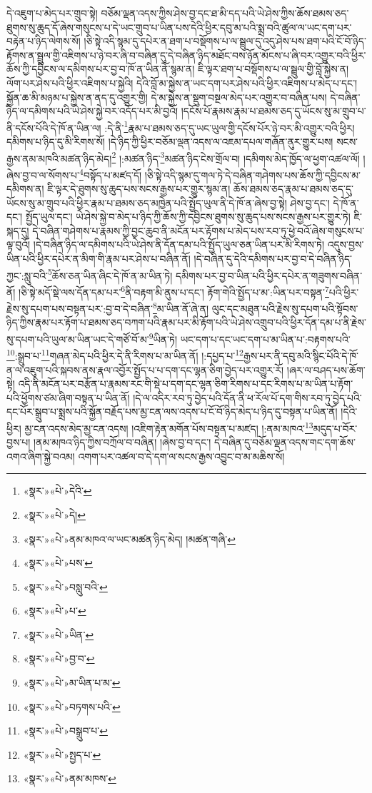 དེ་འཇུག་པ་མེད་པར་གྲུབ་སྟེ། བཅོམ་ལྡན་འདས་ཀྱིས་ཤེས་བྱ་དང་ཐ་མི་དད་པའི་ཡེ་ཤེས་ཀྱིས་ཆོས་ཐམས་ཅད་ཐུགས་སུ་ཆུད་དོ་ཞེས་གསུངས་པ་དེ་ཡང་གྲུབ་པ་ཡིན་པས་དེའི་ཕྱིར་དབུ་མ་པའི་སྨྲ་བའི་ཚུལ་ལ་ཡང་དག་པར་བརྟེན་པ་ཉིད་ལེགས་སོ། །ཅི་སྟེ་འདི་སྙམ་དུ་དཔེར་ན་ཐག་པ་བསྡོགས་པ་ལ་སྦྲུལ་དུ་འདུ་ཤེས་པས་ཐག་པའི་ངོ་བོ་ཉིད་རྟོགས་ན་སྦྲུལ་གྱི་འཇིགས་པ་ཉེ་བར་ཞི་བ་བཞིན་དུ་དེ་བཞིན་ཉིད་མཐོང་བས་ཉོན་མོངས་པ་ཞི་བར་འགྱུར་བའི་ཕྱིར་ཆོས་ཀྱི་དབྱིངས་ལ་དམིགས་པར་བྱ་བ་ཁོ་ན་ཡིན་ནོ་སྙམ་ན། ཇི་ལྟར་ཐག་པ་བསྡོགས་པ་ལ་སྦྲུལ་གྱི་བློ་སྐྱེས་ན། ལོག་པར་ཤེས་པའི་ཕྱིར་འཇིགས་པ་སྐྱེའི། དེའི་བློ་མ་སྐྱེས་ན་ཡང་དག་པར་ཤེས་པའི་ཕྱིར་འཇིགས་པ་མེད་པ་དང་། སྐྱོན་ཆ་མི་མཉམ་པ་སྐྱེས་ན་ནད་དུ་འགྱུར་གྱི། དེ་མ་སྐྱེས་ན་སྡུག་བསྔལ་མེད་པར་འགྱུར་བ་བཞིན་པས། དེ་བཞིན་ཉིད་ལ་དམིགས་པའི་ཡེ་ཤེས་སྐྱེ་བར་འདོད་པར་མི་བྱའོ། །དངོས་པོ་རྣམས་རྣམ་པ་ཐམས་ཅད་དུ་ཡོངས་སུ་མ་གྲུབ་པ་ནི་དངོས་པོའི་དེ་ཁོ་ན་ཡིན་ལ། :དེ་ནི་\footnote{«སྣར་»«པེ་»དེའི་}རྣམ་པ་ཐམས་ཅད་དུ་ཡང་ཡུལ་གྱི་དངོས་པོར་ཉེ་བར་མི་འགྱུར་བའི་ཕྱིར། དམིགས་པ་ཉིད་དུ་མི་རིགས་སོ། །དེ་ཉིད་ཀྱི་ཕྱིར་བཅོམ་ལྡན་འདས་ལ་འཇམ་དཔལ་གཞོན་ནུར་གྱུར་པས། སངས་རྒྱས་ནམ་མཁའི་མཚན་ཉིད་མེད།\footnote{«སྣར་»«པེ་»དེ།} །:མཚན་ཉིད་\footnote{«སྣར་»«པེ་»ནམ་མཁའ་ལ་ཡང་མཚན་ཉིད་མེད། །མཚན་གཞི་}མཚན་ཉིད་ངེས་གྲོལ་བ། །དམིགས་མེད་ཁྱོད་ལ་ཕྱག་འཚལ་ལོ། །ཞེས་བྱ་བ་ལ་སོགས་པ་\footnote{«སྣར་»«པེ་»པས་}བསྟོད་པ་མཛད་དོ། །ཅི་སྟེ་འདི་སྙམ་དུ་གལ་ཏེ་དེ་བཞིན་གཤེགས་པས་ཆོས་ཀྱི་དབྱིངས་མ་དམིགས་ན། ཇི་ལྟར་དེ་ཐུགས་སུ་ཆུད་པས་སངས་རྒྱས་པར་གྱུར་སྙམ་ན། ཆོས་ཐམས་ཅད་རྣམ་པ་ཐམས་ཅད་དུ་ཡོངས་སུ་མ་གྲུབ་པའི་ཕྱིར་རྣམ་པ་ཐམས་ཅད་མཁྱེན་པའི་སྤྱོད་ཡུལ་ནི་དེ་ཁོ་ན་ཞེས་བྱ་སྟེ། ཤེས་བྱ་དང་། དེ་ཁོ་ན་དང་། སྤྱོད་ཡུལ་དང་། ཡེ་ཤེས་སྐྱེ་བ་མེད་པ་ཉིད་ཀྱི་ཆོས་ཀྱི་དབྱིངས་ཐུགས་སུ་ཆུད་པས་སངས་རྒྱས་པར་གྱུར་ཏེ། ཇི་སྐད་དུ། དེ་བཞིན་གཤེགས་པ་རྣམས་ཀྱི་བྱང་ཆུབ་ནི་མངོན་པར་རྟོགས་པ་མེད་པས་རབ་ཏུ་ཕྱེ་བའོ་ཞེས་གསུངས་པ་ལྟ་བུའོ། །དེ་བཞིན་ཉིད་ལ་དམིགས་པའི་ཡེ་ཤེས་ནི་དོན་དམ་པའི་སྤྱོད་ཡུལ་ཅན་ཡིན་པར་མི་རིགས་ཏེ། འདུས་བྱས་ཡིན་པའི་ཕྱིར་དཔེར་ན་མིག་གི་རྣམ་པར་ཤེས་པ་བཞིན་ནོ། །དེ་བཞིན་དུ་དེའི་དམིགས་པར་བྱ་བ་དེ་བཞིན་ཉིད་ཀྱང་:སླུ་བའི་\footnote{«སྣར་»«པེ་»བསླུ་བའི་}ཆོས་ཅན་ཡིན་ཞིང་དེ་ཁོ་ན་མ་ཡིན་ཏེ། དམིགས་པར་བྱ་བ་ཡིན་པའི་ཕྱིར་དཔེར་ན་གཟུགས་བཞིན་ནོ། །ཅི་སྟེ་མདོ་སྡེ་ལས་དོན་དམ་པར་\footnote{«སྣར་»«པེ་»པ་}ནི་བརྟག་མི་ནུས་པ་དང་། རྟོག་གེའི་སྤྱོད་པ་མ་:ཡིན་པར་བསྟན་\footnote{«སྣར་»«པེ་»ཡིན་}པའི་ཕྱིར་རྗེས་སུ་དཔག་པས་བསྟན་པར་:བྱ་བ་དེ་བཞིན་\footnote{«སྣར་»«པེ་»བྱ་བ་}མ་ཡིན་ནོ་ཞེ་ན། ལུང་དང་མཐུན་པའི་རྗེས་སུ་དཔག་པའི་སྟོབས་ཉིད་ཀྱིས་རྣམ་པར་རྟོག་པ་ཐམས་ཅད་བཀག་པའི་རྣམ་པར་མི་རྟོག་པའི་ཡེ་ཤེས་འགྲུབ་པའི་ཕྱིར་དོན་དམ་པ་ནི་རྗེས་སུ་དཔག་པའི་ཡུལ་མ་ཡིན་ཡང་དེ་གཙོ་བོ་མ་\footnote{«སྣར་»«པེ་»མ་ཡིན་པ་མ་}ཡིན་ཏེ། ཡང་དག་པ་དང་ཡང་དག་པ་མ་ཡིན་པ་:བརྟགས་པའི་\footnote{«སྣར་»«པེ་»བཏགས་པའི་}:སྒྲུབ་པ་\footnote{«སྣར་»«པེ་»བསྒྲུབ་པ་}གཞན་མེད་པའི་ཕྱིར་དེ་ནི་རིགས་པ་མ་ཡིན་ནོ། །:དཔྱད་པ་\footnote{«སྣར་»«པེ་»སྤྱད་པ་}རྒྱས་པར་ནི་དབུ་མའི་སྙིང་པོའི་དེ་ཁོ་ན་ལ་འཇུག་པའི་སྐབས་ནས་རྣལ་འབྱོར་སྤྱོད་པ་པ་དག་དང་ལྷན་ཅིག་བྱེད་པར་འགྱུར་རོ། །ཞར་ལ་བཤད་པས་ཆོག་སྟེ། འདི་ནི་མངོན་པར་བརྩོན་པ་རྣམས་རང་གི་སྡེ་པ་དག་དང་ལྷན་ཅིག་རིགས་པ་དང་རིགས་པ་མ་ཡིན་པ་རྟོག་པའི་ཕྱོགས་ཙམ་ཞིག་བསྟན་པ་ཡིན་ནོ། །དེ་ལ་འདིར་རབ་ཏུ་བྱེད་པའི་དོན་ནི་ཕ་རོལ་པོ་དག་གིས་རབ་ཏུ་བྱེད་པའི་དང་པོར་སྒྲུབ་པ་སྨྲས་པའི་སྐྱོན་བརྗོད་པས་མྱ་ངན་ལས་འདས་པ་ངོ་བོ་ཉིད་མེད་པ་ཉིད་དུ་བསྟན་པ་ཡིན་ནོ། །དེའི་ཕྱིར། མྱ་ངན་འདས་མེད་མྱ་ངན་འདས། །འཇིག་རྟེན་མགོན་པོས་བསྟན་པ་མཛད། །:ནམ་མཁའ་\footnote{«སྣར་»«པེ་»ནམ་མཁས་}མདུད་པ་བོར་བྱས་པ། །ནམ་མཁའ་ཉིད་ཀྱིས་བཀྲོལ་བ་བཞིན། །ཞེས་བྱ་བ་དང་། དེ་བཞིན་དུ་བཅོམ་ལྡན་འདས་གང་དག་ཆོས་འགའ་ཞིག་སྐྱེ་བའམ། འགག་པར་འཚལ་བ་དེ་དག་ལ་སངས་རྒྱས་འབྱུང་བ་མ་མཆིས་སོ། 